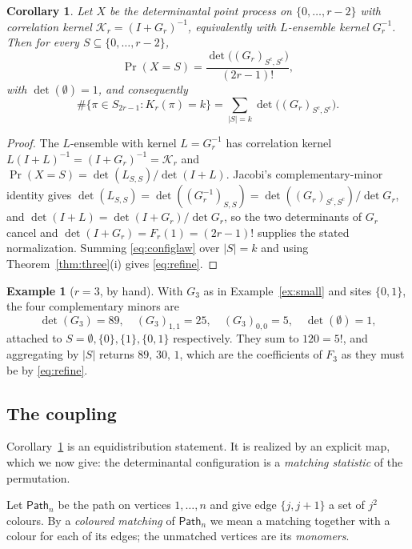 \documentclass[11pt,a4paper]{article}
\theoremstyle{plain}
\newtheorem{corollary}[theorem]{Corollary}
\theoremstyle{definition}
\newtheorem{example}[theorem]{Example}
\theoremstyle{remark}
\begin{document}
\begin{corollary}\label{cor:config}
Let $X$ be the determinantal point process on $\{0,\dots,r-2\}$ with correlation
kernel $\mathcal K_r=(I+G_r)^{-1}$, equivalently with $L$-ensemble kernel
$G_r^{-1}$. Then for every $S\subseteq\{0,\dots,r-2\}$,
\begin{equation}\label{eq:configlaw}
  \Pr(X=S)=\frac{\det\bigl((G_r)_{S^c,S^c}\bigr)}{(2r-1)!},
\end{equation}
with $\det(\emptyset)=1$, and consequently
\begin{equation}\label{eq:refine}
  \#\{\pi\in S_{2r-1}:K_r(\pi)=k\}=\sum_{|S|=k}\det\bigl((G_r)_{S^c,S^c}\bigr).
\end{equation}
\end{corollary}

\begin{proof}
The $L$-ensemble with kernel $L=G_r^{-1}$ has correlation kernel
$L(I+L)^{-1}=(I+G_r)^{-1}=\mathcal K_r$ and
$\Pr(X=S)=\det(L_{S,S})/\det(I+L)$. Jacobi's complementary-minor identity gives
$\det(L_{S,S})=\det((G_r^{-1})_{S,S})=\det((G_r)_{S^c,S^c})/\det G_r$, and
$\det(I+L)=\det(I+G_r)/\det G_r$, so the two determinants of $G_r$ cancel and
$\det(I+G_r)=F_r(1)=(2r-1)!$ supplies the stated normalization. Summing
\eqref{eq:configlaw} over $|S|=k$ and using
Theorem~\ref{thm:three}(i) gives \eqref{eq:refine}.
\end{proof}

\begin{example}[$r=3$, by hand]
With $G_3$ as in Example~\ref{ex:small} and sites $\{0,1\}$, the four
complementary minors are
\[
  \det(G_3)=89,\quad (G_3)_{1,1}=25,\quad (G_3)_{0,0}=5,\quad \det(\emptyset)=1,
\]
attached to $S=\emptyset,\{0\},\{1\},\{0,1\}$ respectively. They sum to
$120=5!$, and aggregating by $|S|$ returns $89,\,30,\,1$, which are the
coefficients of $F_3$ as they must be by \eqref{eq:refine}.
\end{example}

\subsection{The coupling}\label{sec:coupling}

Corollary~\ref{cor:config} is an equidistribution statement. It is realized by an
explicit map, which we now give: the determinantal configuration is a
\emph{matching statistic} of the permutation.

Let $\mathsf{Path}_n$ be the path on vertices $1,\dots,n$ and give edge
$\{j,j+1\}$ a set of $j^2$ colours. By a \emph{coloured matching} of
$\mathsf{Path}_n$ we mean a matching together
with a colour for each of its edges; the unmatched vertices are its
\emph{monomers}.
\end{document}
